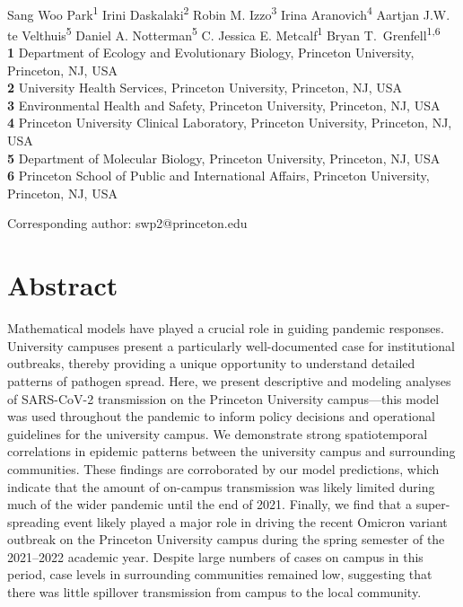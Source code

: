 \documentclass[12pt]{article}
\date{\today}
\begin{document}
\begin{flushleft}{
	\Large
	\textbf{}
}
\newline
\\
Sang Woo Park\textsuperscript{1}
Irini Daskalaki\textsuperscript{2}
Robin M. Izzo\textsuperscript{3}
Irina Aranovich\textsuperscript{4}
Aartjan J.W. te Velthuis\textsuperscript{5}
Daniel A. Notterman\textsuperscript{5}
C. Jessica E. Metcalf\textsuperscript{1}
Bryan T.\ Grenfell\textsuperscript{1,6}
\\
\bigskip
\textbf{1} Department of Ecology and Evolutionary Biology, Princeton University, Princeton, NJ, USA
\\
\textbf{2} University Health Services, Princeton University, Princeton, NJ, USA
\\
\textbf{3} Environmental Health and Safety, Princeton University, Princeton, NJ, USA
\\
\textbf{4} Princeton University Clinical Laboratory, Princeton University, Princeton, NJ, USA
\\
\textbf{5} Department of Molecular Biology, Princeton University, Princeton, NJ, USA
\\
\textbf{6} Princeton School of Public and International Affairs, Princeton University, Princeton, NJ, USA
\\
\bigskip

Corresponding author: swp2@princeton.edu
\bigskip
\end{flushleft}

\section*{Abstract}

Mathematical models have played a crucial role in guiding pandemic responses. 
University campuses present a particularly well-documented case for institutional outbreaks, thereby providing a unique opportunity to understand detailed patterns of pathogen spread.
Here, we present descriptive and modeling analyses of SARS-CoV-2 transmission on the Princeton University campus---this model was used throughout the pandemic to inform policy decisions and operational guidelines for the university campus.
We demonstrate strong spatiotemporal correlations in epidemic patterns between the university campus and surrounding communities.
These findings are corroborated by our model predictions, which indicate that the amount of on-campus transmission was likely limited during much of the wider pandemic until the end of 2021.
Finally, we find that a super-spreading event likely played a major role in driving the recent Omicron variant outbreak on the Princeton University campus during the spring semester of the 2021--2022 academic year.
Despite large numbers of cases on campus in this period, case levels in surrounding communities remained low, suggesting that there was little spillover transmission from campus to the local community.
\end{document}
